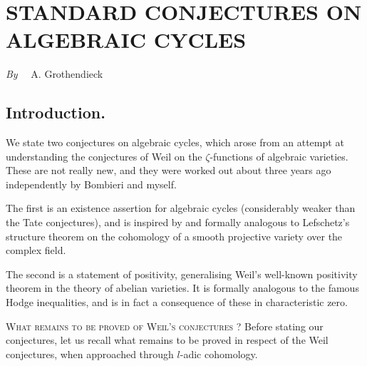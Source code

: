 \chapter[\textsc{A. Grothendieck~:} Standard Conjectures on Algebraic Cycles]{STANDARD CONJECTURES ON ALGEBRAIC CYCLES}\label{art09}

\begin{center}
{\em By}~~ A. Grothendieck
\end{center}

\setcounter{pageoriginal}{192}
\renewcommand\thesection{\arabic{section}}
\section{Introduction.}\label{art09-sec1}\pageoriginale


We state two conjectures on algebraic cycles, which arose from an attempt at understanding the conjectures of Weil on the $\zeta$-functions of algebraic varieties. These are not really new, and they were worked out about three years ago independently by Bombieri and myself.

The first is an existence assertion for algebraic cycles (considerably weaker than the Tate conjectures), and is inspired by and formally analogous to Lefschetz's structure theorem on the cohomology of a smooth projective variety over the complex field.

The second is a statement of positivity, generalising Weil's well-known positivity theorem in the theory of abelian varieties. It is formally analogous to the famous Hodge inequalities, and is in fact a consequence of these in characteristic zero.

\textsc{What remains to be proved of Weil's conjectures ?} Before stating our conjectures, let us recall what remains to be proved in respect of the Weil conjectures, when approached through $l$-adic cohomology.

